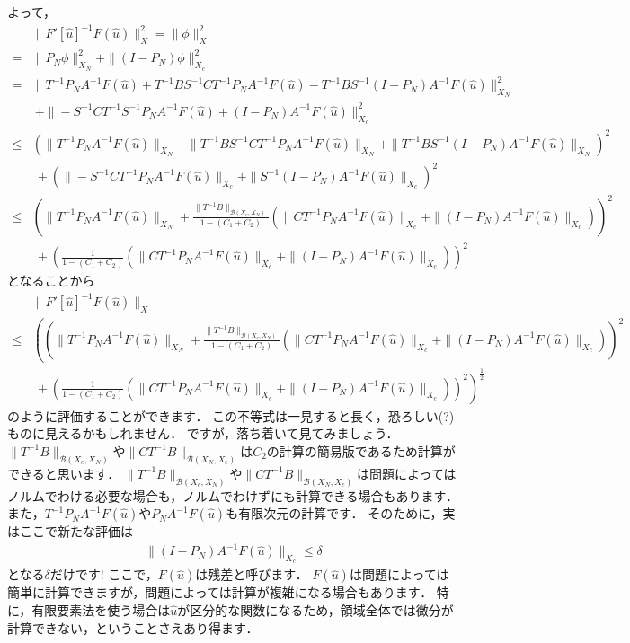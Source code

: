 よって，
{\small \begin{align*}
	& \| F'[\hat{u}]^{-1} F(\hat{u}) \|_{X}^2 = \| \phi \|_{X}^2 \\ 
	=&  \| P_N \phi \|_{X_N}^2 + \| (I - P_N) \phi \|_{X_c}^2 \\
	=&  \| T^{-1} P_N A^{-1} F( \hat{u} ) + T^{-1} B S^{-1} C T^{-1} P_N A^{-1} F( \hat{u} ) -T^{-1} B S^{-1} (I-P_N) A^{-1} F( \hat{u} )  \|_{X_N}^2 \\
	& ~+ \|-S^{-1} C T^{-1} S^{-1} P_N A^{-1} F( \hat{u} ) + (I-P_N) A^{-1} F( \hat{u} ) \|_{X_c}^2 \\
	\le&  \left( \| T^{-1} P_N A^{-1} F( \hat{u} ) \|_{X_N} + \|  T^{-1} B S^{-1} C T^{-1} P_N A^{-1} F( \hat{u} ) \|_{X_N} + \| T^{-1} B S^{-1} (I-P_N) A^{-1} F( \hat{u} )  \|_{X_N} \right)^2 \\
	& ~+ \left( \|-S^{-1} C T^{-1}  P_N A^{-1} F( \hat{u} ) \|_{X_c} + \| S^{-1} (I-P_N) A^{-1} F( \hat{u} ) \|_{X_c} \right)^2 \\
	\le& \left( \| T^{-1} P_N A^{-1} F( \hat{u} ) \|_{X_N} + \frac{ \|  T^{-1} B \|_{{\mathcal B}(X_c, X_N)}}{1-(C_1 + C_2)}  \left( \| C T^{-1} P_N A^{-1} F( \hat{u} ) \|_{X_c} + \| (I-P_N) A^{-1} F( \hat{u} )  \|_{X_c} \right) \right)^2 \\
	& ~+ \left( \frac{1}{1 - (C_1 + C_2)} \left( \| C T^{-1}  P_N A^{-1} F( \hat{u} ) \|_{X_c} + \| (I-P_N) A^{-1} F( \hat{u} ) \|_{X_c} \right) \right)^2
\end{align*}}
となることから
{\small \begin{align*}
	& \| F'[\hat{u}]^{-1} F(\hat{u}) \|_{X} \\
	\le& \left( \left( \| T^{-1} P_N A^{-1} F( \hat{u} ) \|_{X_N} + \frac{ \|  T^{-1} B \|_{{\mathcal B}(X_c, X_N)}}{1-(C_1 + C_2)}  \left( \| C T^{-1} P_N A^{-1} F( \hat{u} ) \|_{X_c} + \| (I-P_N) A^{-1} F( \hat{u} )  \|_{X_c} \right) \right)^2 \right. \\
	& ~+  \left. \left( \frac{1}{1 - (C_1 + C_2)} \left( \| C T^{-1}  P_N A^{-1} F( \hat{u} ) \|_{X_c} + \| (I-P_N) A^{-1} F( \hat{u} ) \|_{X_c} \right) \right)^2 \right)^{\frac{1}{2}}
\end{align*}}
のように評価することができます．
この不等式は一見すると長く，恐ろしい(?)ものに見えるかもしれません．
ですが，落ち着いて見てみましょう．
$\| T^{-1} B \|_{{\mathcal B}(X_c, X_N)}$や$\| C T^{-1}B \|_{{\mathcal B}(X_N, X_c)}$は$C_2$の計算の簡易版であるため計算ができると思います．
$\| T^{-1} B \|_{{\mathcal B}(X_c, X_N)}$や$\| C T^{-1}B \|_{{\mathcal B}(X_N, X_c)}$は問題によってはノルムでわける必要な場合も，ノルムでわけずにも計算できる場合もあります．
また，$T^{-1} P_N A^{-1} F( \hat{u} )$や$P_N A^{-1} F( \hat{u} )$も有限次元の計算です．
そのために，実はここで新たな評価は
\begin{align*}
	\| (I-P_N) A^{-1} F( \hat{u} ) \|_{X_c} \le \delta
\end{align*}
となる$\delta$だけです!
ここで，$F( \hat{u} )$は残差と呼びます．
$F( \hat{u} )$は問題によっては簡単に計算できますが，問題によっては計算が複雑になる場合もあります．
特に，有限要素法を使う場合は$\hat{u}$が区分的な関数になるため，領域全体では微分が計算できない，ということさえあり得ます．

